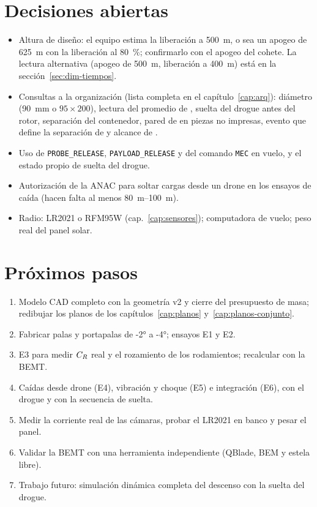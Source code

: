 \section*{Decisiones abiertas}
\begin{itemize}
  \item Altura de diseño: el equipo estima la liberación a \SI{500}{m}, o sea un apogeo de
        \SI{625}{m} con la liberación al \SI{80}{\percent}; confirmarlo con el apogeo del cohete. La
        lectura alternativa (apogeo de \SI{500}{m}, liberación a \SI{400}{m}) está en la
        sección~\ref{sec:dim-tiempos}.
  \item Consultas a la organización (lista completa en el capítulo~\ref{cap:arq}):
        diámetro (\SI{90}{mm} o $95\times200$), lectura del promedio de , suelta del
        drogue antes del rotor, separación del contenedor, pared de  en piezas no
        impresas, evento que define la separación de  y alcance de .
  \item Uso de \texttt{PROBE\_RELEASE}, \texttt{PAYLOAD\_RELEASE} y del comando \texttt{MEC} en
        vuelo, y el estado propio de suelta del drogue.
  \item Autorización de la ANAC para soltar cargas desde un drone en los ensayos de caída
        (hacen falta al menos \SIrange{80}{100}{m}).
  \item Radio: LR2021 o RFM95W (cap.~\ref{cap:sensores}); computadora de vuelo; peso real del
        panel solar.
\end{itemize}

\section*{Próximos pasos}
\begin{enumerate}
  \item Modelo CAD completo con la geometría v2 y cierre del presupuesto de masa; redibujar los
        planos de los capítulos~\ref{cap:planos} y~\ref{cap:planos-conjunto}.
  \item Fabricar palas y portapalas de \ang{-2} a \ang{-4}; ensayos E1 y E2.
  \item E3 para medir $C_{R}$ real y el rozamiento de los rodamientos; recalcular con la BEMT.
  \item Caídas desde drone (E4), vibración y choque (E5) e integración (E6), con el drogue y con
        la secuencia de suelta.
  \item Medir la corriente real de las cámaras, probar el LR2021 en banco y pesar el panel.
  \item Validar la BEMT con una herramienta independiente (QBlade, BEM y estela libre).
  \item Trabajo futuro: simulación dinámica completa del descenso con la suelta del drogue.
\end{enumerate}
